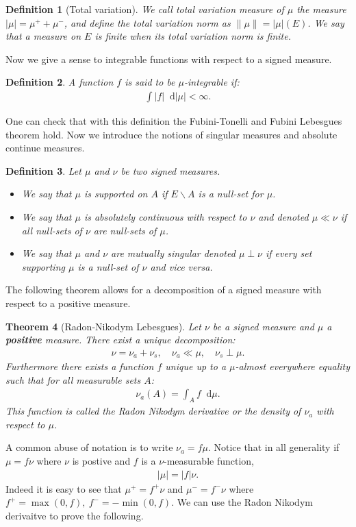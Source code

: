\documentclass[11pt,a4paper]{article}
\newcommand{\dd}{\mathop{}\!\mathrm{d}}
\newtheorem{theorem}{Theorem}[section]
\newtheorem{definition}[theorem]{Definition}
\begin{document}
\begin{definition}[Total variation]
    We call total variation measure of $\mu$ the measure $|\mu| = \mu^+ + \mu^-$, and define the total variation norm as $\|\mu\| = |\mu|(E)$. We say that a measure on $E$ is finite when its total variation norm is finite.
\end{definition}
Now we give a sense to integrable functions with respect to a signed measure.
\begin{definition}
    A function $f$ is said to be $\mu$-integrable if:
    \begin{align*}
        \int |f|\dd |\mu| < \infty.
    \end{align*}
\end{definition}
One can check that with this definition the Fubini-Tonelli and Fubini Lebesgues theorem hold. Now we introduce the notions of singular measures and absolute continue measures. 

\begin{definition}
    Let $\mu$ and $\nu$ be two signed measures.
    \begin{itemize}
        \item We say that $\mu$ is supported on $A$ if $E\backslash A$ is a null-set for $\mu$.
        \item We say that $\mu$ is absolutely continuous with respect to $\nu$ and denoted $\mu \ll \nu$ if all null-sets of $\nu$ are null-sets of $\mu$.
        \item We say that $\mu$ and $\nu$ are mutually singular denoted $\mu \perp \nu$ if every set supporting $\mu$ is a null-set of $\nu$ and vice versa.
    \end{itemize}
\end{definition}
The following theorem allows for a decomposition of a signed measure with respect to a positive measure.
\begin{theorem}[Radon-Nikodym Lebesgues]
    Let $\nu$ be a signed measure and $\mu$ a \textbf{positive} measure. There exist a unique decomposition:
    \begin{align*}
        \nu = \nu_{a} + \nu_s, \quad  \nu_{a}\ll \mu, \quad \nu_s \perp \mu .
    \end{align*}
    Furthermore there exists a function $f$ unique up to a $\mu$-almost everywhere equality such that for all measurable sets $A$:
    \begin{align*}
        \nu_{a}(A) = \int_A f\dd \mu.
    \end{align*}
    This function is called the Radon Nikodym derivative or the density of $\nu_{a}$ with respect to $\mu$.
\end{theorem}
A common abuse of notation is to write $\nu_{a} = f\mu$. Notice that in all generality if $\mu = f\nu$ where $\nu$ is postive and $f$ is a $\nu$-measurable function,
\begin{align*}
        |\mu| = |f|\nu.
\end{align*}
Indeed it is easy to see that $\mu^+ = f^+\nu$ and $\mu^- = f^- \nu$ where $f^+ = \max(0,f),\ f^- = -\min(0,f)$. We can use the Radon Nikodym derivaitve to prove the following.
\end{document}
